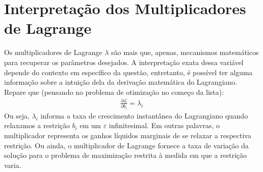 \section{Interpretação dos Multiplicadores de Lagrange}
Os multiplicadores de Lagrange $\lambda$ são mais que, apenas, mecanismos matemáticos para recuperar os parâmetros desejados. A interpretação exata dessa variável depende do contexto em específico da questão, entretanto, é possível ter alguma informação sobre a intuição dela da derivação matemática do Lagrangiano. Repare que (pensando no problema de otimização no começo da lista):
\begin{align*}
    \frac{\partial\mathcal{L}}{\partial b_i} = \lambda_i
\end{align*}
Ou seja, $\lambda_i$ informa a taxa de crescimento instantânea do Lagrangiano quando relaxamos a restrição $b_i$ em um $\varepsilon$ infinitesimal. Em outras palavras, o multiplicador representa os ganhos líquidos marginais de se relaxar a respectiva restrição. Ou ainda, o multiplicador de Lagrange fornece a taxa de variação da solução para o problema de maximização restrita à medida em que a restrição varia. 